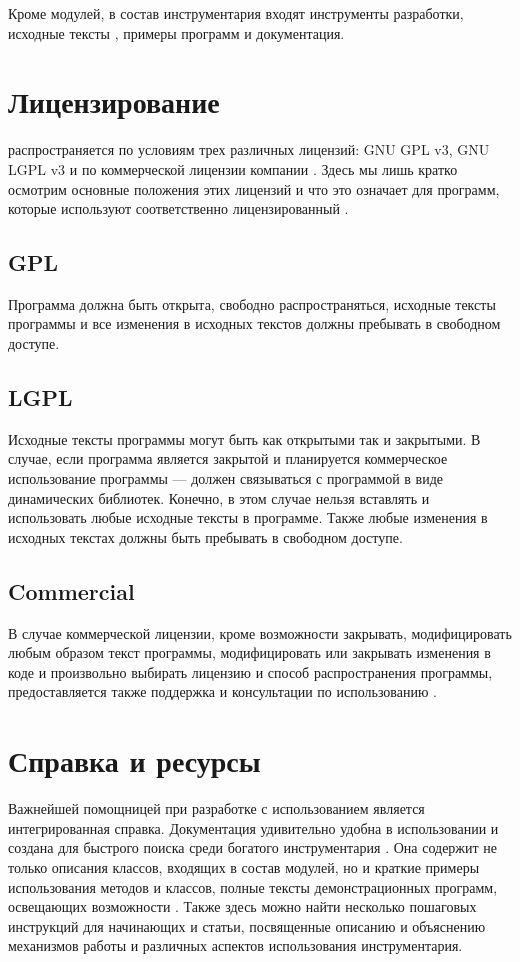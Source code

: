 Кроме модулей, в состав инструментария входят инструменты разработки, исходные тексты , примеры программ
и документация.

\section[Лицензирование \Sys{Qt} ]{Лицензирование }
 распространяется по условиям трех различных лицензий: GNU GPL v3, GNU LGPL v3 и по коммерческой
лицензии компании . Здесь мы лишь кратко осмотрим основные положения этих лицензий и что это означает для
программ, которые используют соответственно лицензированный .

\subsection[GPL]{GPL}
Программа должна быть открыта, свободно распространяться, исходные тексты программы и все изменения в
исходных текстов  должны пребывать в свободном доступе.

\subsection[LGPL]{LGPL}
Исходные тексты программы могут быть как открытыми так и закрытыми. В случае, если программа является
закрытой и планируется коммерческое использование программы ---  должен связываться с программой в виде
динамических библиотек. Конечно, в этом случае нельзя вставлять и использовать любые
исходные тексты  в программе. Также любые изменения в исходных текстах  должны быть 
пребывать в свободном доступе.

\subsection[Commercial]{Commercial}
В случае коммерческой лицензии, кроме возможности закрывать, модифицировать любым образом текст программы,
модифицировать или закрывать изменения в коде  и произвольно выбирать лицензию и способ распространения программы,
предоставляется также поддержка и консультации по использованию .

\section[Справка и ресурсы]{Справка и ресурсы}
Важнейшей помощницей при разработке с использованием  является интегрированная справка. Документация 
удивительно удобна в использовании и создана для быстрого поиска среди богатого инструментария . Она содержит не
только описания классов, входящих в состав модулей, но и краткие примеры использования методов и классов, полные тексты
демонстрационных программ, освещающих возможности . Также здесь можно найти несколько пошаговых инструкций для
начинающих и статьи, посвященные описанию и
объяснению механизмов работы и различных аспектов использования инструментария.

